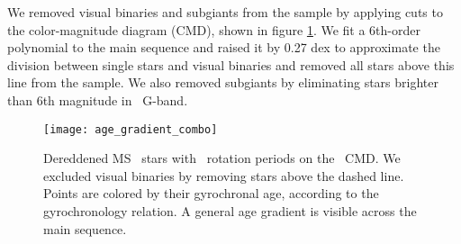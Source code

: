 We removed visual binaries and subgiants from the sample by applying cuts to
the color-magnitude diagram (CMD), shown in figure \ref{fig:age_gradient}.
We fit a 6th-order polynomial to the main sequence and raised it by 0.27 dex
to approximate the division between single stars and visual binaries and
removed all stars above this line from the sample.
We also removed subgiants by eliminating stars brighter than 6th magnitude in
\gaia\ G-band.
\begin{figure}
  \caption{
Dereddened MS \kepler\ stars with \mct\ rotation periods on the \gaia\ CMD.
We excluded visual binaries by removing stars above the dashed line.
    Points are colored by their gyrochronal
    age, according to the
    \citet{angus2019} gyrochronology relation.
    A general age gradient is visible across the main sequence.
}
  \centering
    \texttt{[image: age\_gradient\_combo]}
\label{fig:age_gradient}
\end{figure}


